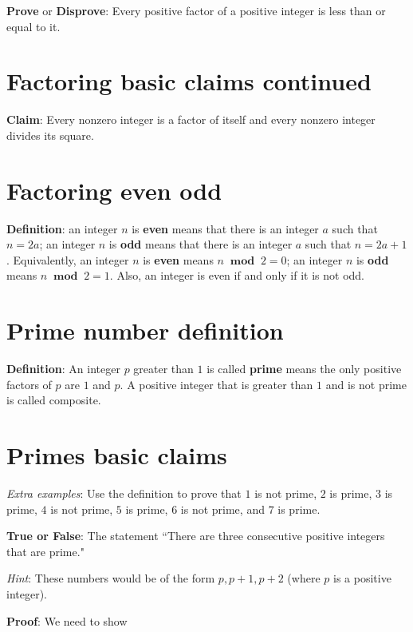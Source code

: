 \documentclass[12pt, oneside]{article}
\begin{document}
\vspace{150pt}

{\bf Prove} or {\bf Disprove}: Every positive factor of a positive integer is less than or equal to it.

\vspace{150pt}
 \vfill
\section*{Factoring basic claims continued}


{\bf Claim}: Every nonzero integer is a factor of itself and 
every nonzero integer divides its square.

\vspace{100pt}
 \vfill
\section*{Factoring even odd}


{\bf Definition}: an integer $n$ is {\bf even} means that there is an integer $a$ such that $n = 2a$; 
an integer $n$ is {\bf odd} means that there is an integer $a$ such that $n = 2a+1$.  Equivalently, 
an integer $n$ is {\bf even} means $n ~\textbf{ mod }~2 = 0$; an integer $n$ is {\bf odd} means $n ~\textbf{ mod }~2 = 1$.  
Also, an integer is even if and only if it is not odd.
 \vfill
\section*{Prime number definition}


{\bf Definition}:  An integer $p$ greater than $1$ is called {\bf prime} means 
the only positive factors of 
$p$ are $1$ and $p$. A positive integer that is greater than $1$ and is not prime 
is called composite. \vfill
\section*{Primes basic claims}


{\it Extra examples}: Use the definition to prove that $1$ is not prime, $2$ is prime, $3$
is prime, $4$ is not prime, $5$ is prime, $6$ is not prime, and $7$ is prime.


{\bf True or False}: The statement ``There are three consecutive positive integers that are prime."

{\it Hint}: These numbers would be of the form $p, p+1, p+2$ (where $p$ is a positive integer).

{\bf Proof}: We need to show \underline{}
\end{document}
